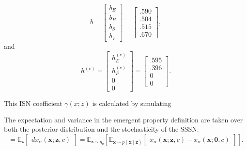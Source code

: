 \documentclass[11pt]{article}
\begin{document}
\begin{equation}
b =  \begin{bmatrix} b_E \\ b_P \\ b_S \\ b_V \end{bmatrix} =
 \begin{bmatrix} .590 \\ .504 \\ .515 \\ .670 \end{bmatrix} ,
\end{equation} 
and
\begin{equation} 
h^{(c)} = \begin{bmatrix} h^{(c)}_E \\ h^{(c)}_P \\ 0 \\ 0 \end{bmatrix} = 
\begin{bmatrix} .595 \\ .396 \\ 0 \\ 0 \end{bmatrix}.
\end{equation} 

This ISN coefficient $\gamma(x; z)$ is calculated by simulating 


The expectation and variance in the emergent property definition are taken over both the posterior distribution and the stochasticity of the SSSN:
\begin{equation}
= \mathbb{E}_{\mathbf{z}}\begin{bmatrix} dx_\alpha(\mathbf{x}; \mathbf{z},c) \end{bmatrix}  = \mathbb{E}_{\mathbf{z}\sim q_\theta} \left[ \mathbb{E}_{\mathbf{x} \sim p(\mathbf{x} \mid \mathbf{z})} \begin{bmatrix} x_\alpha(\mathbf{x}; \mathbf{z},c) - x_\alpha(\mathbf{x}; \mathbf{0},c) \end{bmatrix}\right].
\end{equation}
\end{document}
